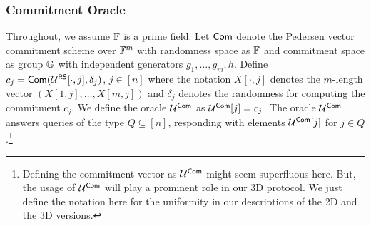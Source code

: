 \subsubsection{Commitment Oracle}\label{subsec: commit}
Throughout, we assume $\mathbb{F}$ is a prime field. Let $\mathsf{Com}$ denote the Pedersen vector commitment scheme over $\mathbb{F}^m$ with randomness space as $\mathbb{F}$ and commitment space as group $\mathbb{G}$ with independent generators $g_1,\ldots,g_m, h$. Define $c_{j} = \mathsf{Com}(\mathcal{U}^{\mathsf{RS}}[\cdot,j],\delta_{j})$, $j\in [n]$ where the notation $X[\cdot,j]$ denotes the $m$-length vector $(X[1,j],\ldots,X[m,j])$ and $\delta_{j}$ denotes the randomness for computing the commitment $c_{j}$. We define the oracle $\mathcal{U}^{\mathsf{Com}}$ as $\mathcal{U}^{\mathsf{Com}}[j]=c_{j}$. The oracle $\mathcal{U}^{\mathsf{Com}}$ answers queries of the type $Q\subseteq [n]$, responding with elements $\mathcal{U}^{\mathsf{Com}}[j]$ for $j\in Q$.\footnote{Defining the commitment vector as $\mathcal{U}^{\mathsf{Com}}$ might seem superfluous here. But, the usage of $\mathcal{U}^{\mathsf{Com}}$ will play a prominent role in our 3D protocol. We just define the notation here for the uniformity in our descriptions of the 2D and the 3D versions.} 



